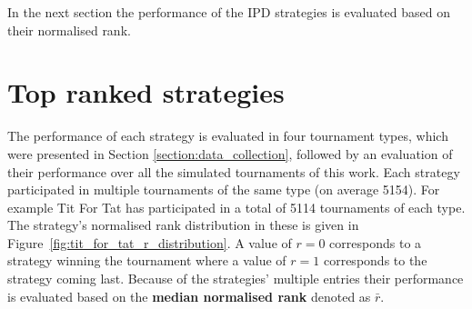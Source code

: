 \documentclass{article}
\newcommand{\numberofalltournaments}{}
\newcommand{\numberofstrategies}{}
\begin{document}
\begin{table}[!htbp]
    \begin{center}
\end{center}
\caption{Output result of a single tournament.}\label{table:output_result}
\end{table}

In the next section the performance of the \numberofstrategies IPD strategies is
evaluated based on their normalised rank.

\section{Top ranked strategies}\label{section:top_performances}

The performance of each strategy is evaluated in four tournament types, which
were presented in Section \ref{section:data_collection}, followed by an
evaluation of their performance over all the \numberofalltournaments simulated
tournaments of this work. Each strategy participated in multiple tournaments of
the same type (on average 5154). For example Tit For Tat has participated in a
total of 5114 tournaments of each type. The strategy's normalised rank
distribution in these is given in Figure~\ref{fig:tit_for_tat_r_distribution}. A
value of \(r = 0\) corresponds to a strategy winning the tournament where a
value of \(r = 1\) corresponds to the strategy coming last. Because of the
strategies' multiple entries their performance is evaluated based on the
\textbf{median normalised rank} denoted as \(\bar{r}\).
\end{document}
